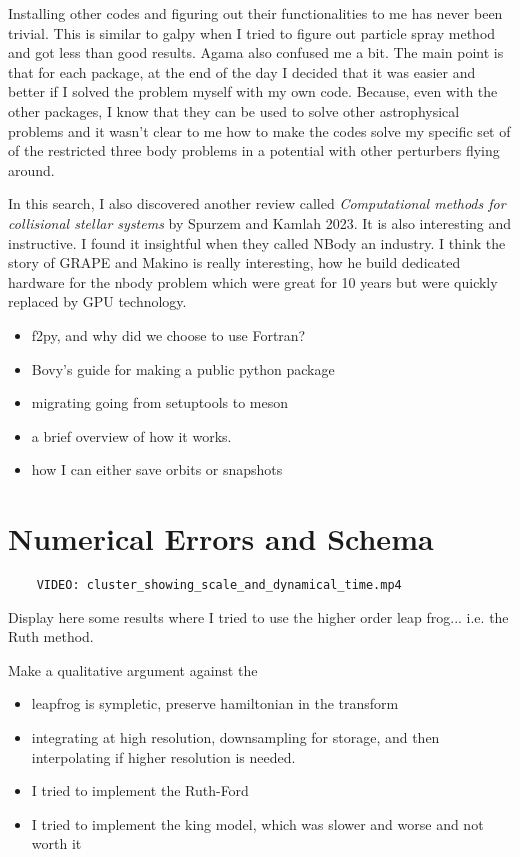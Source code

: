     Installing other codes and figuring out their functionalities to me has never been trivial. This is similar to galpy when I tried to figure out particle spray method and got less than good results. Agama also confused me a bit. The main point is that for each package, at the end of the day I decided that it was easier and better if I solved the problem myself with my own code. Because, even with the other packages, I know that they can be used to solve other astrophysical problems and it wasn't clear to me how to make the codes solve my specific set of of the restricted three body problems in a potential with other perturbers flying around. 

    In this search, I also discovered another review called \textit{Computational methods for collisional stellar systems} by Spurzem and Kamlah 2023. It is also interesting and instructive. I found it insightful when they called NBody an industry. I think the story of GRAPE and Makino is really interesting, how he build dedicated hardware for the nbody problem which were great for 10 years but were quickly replaced by GPU technology. 
    \begin{itemize}
        \item f2py, and why did we choose to use Fortran? 
        \item Bovy's guide for making a public python package
        \item migrating going from setuptools to meson
        \item a brief overview of how it works. 
        \item how I can either save orbits or snapshots
    \end{itemize}



\section{Numerical Errors and Schema} 

    \begin{verbatim}
    VIDEO: cluster_showing_scale_and_dynamical_time.mp4
    \end{verbatim}
    Display here some results where I tried to use the higher order leap frog... i.e. the Ruth method. 

    Make a qualitative argument against the 

    \begin{itemize}
        \item leapfrog is sympletic, preserve hamiltonian in the transform
        \item integrating at high resolution, downsampling for storage, and then interpolating if higher resolution is needed. 
        \item I tried to implement the Ruth-Ford
        \item I tried to implement the king model, which was slower and worse and not worth it 
    \end{itemize}



